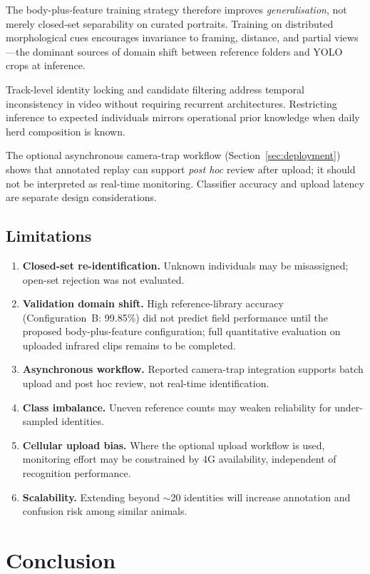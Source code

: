 \documentclass[preprint,12pt,3p,times]{elsarticle}
\begin{document}
The body-plus-feature training strategy therefore improves \emph{generalisation}, not merely closed-set separability on curated portraits. Training on distributed morphological cues encourages invariance to framing, distance, and partial views---the dominant sources of domain shift between reference folders and YOLO crops at inference.

Track-level identity locking and candidate filtering address temporal inconsistency in video without requiring recurrent architectures. Restricting inference to expected individuals mirrors operational prior knowledge when daily herd composition is known.

The optional asynchronous camera-trap workflow (Section~\ref{sec:deployment}) shows that annotated replay can support \emph{post hoc} review after upload; it should not be interpreted as real-time monitoring. Classifier accuracy and upload latency are separate design considerations.

\subsection{Limitations}

\begin{enumerate}
  \item \textbf{Closed-set re-identification.} Unknown individuals may be misassigned; open-set rejection was not evaluated.
  \item \textbf{Validation domain shift.} High reference-library accuracy (Configuration~B: 99.85\%) did not predict field performance until the proposed body-plus-feature configuration; full quantitative evaluation on uploaded infrared clips remains to be completed.
  \item \textbf{Asynchronous workflow.} Reported camera-trap integration supports batch upload and post hoc review, not real-time identification.
  \item \textbf{Class imbalance.} Uneven reference counts may weaken reliability for under-sampled identities.
  \item \textbf{Cellular upload bias.} Where the optional upload workflow is used, monitoring effort may be constrained by 4G availability, independent of recognition performance.
  \item \textbf{Scalability.} Extending beyond ${\sim}$20 identities will increase annotation and confusion risk among similar animals.
\end{enumerate}

\section{Conclusion}
\label{sec:conclusion}
\end{document}
